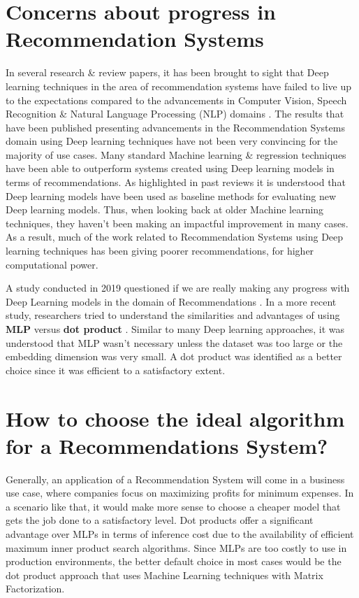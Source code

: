 \documentclass[manuscript,screen,natbib=false]{acmart}
\begin{document}
\section{Concerns about progress in Recommendation Systems}
In several research \& review papers, it has been brought to sight that Deep learning techniques in the area of recommendation systems have failed to live up to the expectations compared to the advancements in Computer Vision, Speech Recognition \& Natural Language Processing (NLP) domains \cite{choi_local_2021}. The results that have been published presenting advancements in the Recommendation Systems domain using Deep learning techniques have not been very convincing for the majority of use cases. Many standard Machine learning \& regression techniques have been able to outperform systems created using Deep learning models in terms of recommendations. As highlighted in past reviews \cite{dacrema_are_2019} it is understood that Deep learning models have been used as baseline methods for evaluating new Deep learning models. Thus, when looking back at older Machine learning techniques, they haven't been making an impactful improvement in many cases. As a result, much of the work related to Recommendation Systems using Deep learning techniques has been giving poorer recommendations, for higher computational power.


A study conducted in 2019 questioned if we are really making any progress with Deep Learning models in the domain of Recommendations \cite{dacrema_are_2019}. In a more recent study, researchers tried to understand the similarities and advantages of using \textbf{MLP} versus \textbf{dot product} \cite{rendle_neural_2020}. Similar to many Deep learning approaches, it was understood that MLP wasn't necessary unless the dataset was too large or the embedding dimension was very small. A dot product was identified as a better choice since it was efficient to a satisfactory extent.

\section{How to choose the ideal algorithm for a Recommendations System?}

Generally, an application of a Recommendation System will come in a business use case, where companies focus on maximizing profits for minimum expenses. In a scenario like that, it would make more sense to choose a cheaper model that gets the job done to a satisfactory level. Dot products offer a significant advantage over MLPs in terms of inference cost due to the availability of efficient maximum inner product search algorithms. Since MLPs are too costly to use in production environments, the better default choice in most cases would be the dot product approach that uses Machine Learning techniques with Matrix Factorization.
\end{document}
